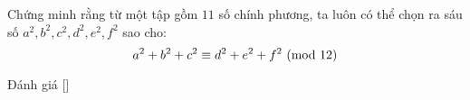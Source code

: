 \ifshowproblem
\begin{problem}\label{problem:IND-2015-MO-P6}
	Chứng minh rằng từ một tập gồm \( 11 \) số chính phương, ta luôn có thể chọn ra sáu số \( a^2, b^2, c^2, d^2, e^2, f^2 \) sao cho:
	\[
		a^2 + b^2 + c^2 \equiv d^2 + e^2 + f^2 \ (\mathrm{mod}\ 12)
	\]
\end{problem}
\fi

\ifshowinfo
Đánh giá [\textbf{}]\footnotemark
{}
\fi